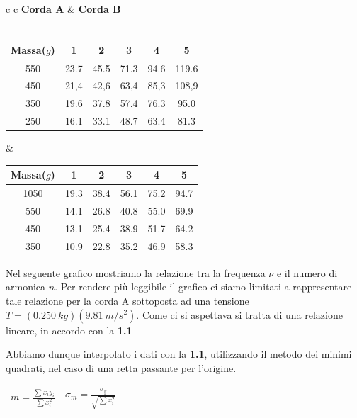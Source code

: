 \begin{center}
\begin{tabular}{c     c}
\textbf{Corda A} & \textbf{Corda B}\\
\\
\begin{tabular}{ c | c | c | c | c | c }
Massa($g$) & 1 & 2 & 3 & 4 & 5\\
\midrule
550 & 23.7 & 45.5 & 71.3 & 94.6 & 119.6\\
450 & 21,4 & 42,6 & 63,4 & 85,3 & 108,9\\
350 & 19.6 & 37.8 & 57.4 & 76.3 & 95.0\\
250 & 16.1 & 33.1 & 48.7 & 63.4 & 81.3 \\
\end{tabular}
&
\hspace{1cm}

\begin{tabular}{ c | c | c | c | c | c }
Massa($g$) & 1 & 2 & 3 & 4 & 5\\
\midrule
1050 & 19.3 & 38.4 & 56.1 & 75.2 & 94.7 \\
550 & 14.1 & 26.8 & 40.8 & 55.0 & 69.9 \\
450 & 13.1 & 25.4 & 38.9 & 51.7 & 64.2\\
350 & 10.9 & 22.8 & 35.2 & 46.9 & 58.3\\
\end{tabular}

\end{tabular}
\end{center}


Nel seguente grafico mostriamo la relazione tra la frequenza $\nu$ e il numero di armonica $n$. Per rendere più leggibile il grafico ci siamo limitati a rappresentare tale relazione per la corda A sottoposta ad una tensione $T=(0.250\ kg)(9.81\ m/s^2)$. Come ci si aspettava si tratta di una relazione lineare, in accordo con la \textbf{1.1}


Abbiamo dunque interpolato i dati con la \textbf{1.1}, utilizzando il metodo dei minimi quadrati, nel caso di una retta passante per l'origine.

\begin{center}
\begin{tabular}{c c}
$m=\frac{\displaystyle\sum{x_i y_i}}{\displaystyle\sum{x_i^2}}$ & \hspace{2cm} $\sigma_m=\frac{\displaystyle\sigma_y}{\sqrt{\displaystyle\sum{x_i^2}}}$
\end{tabular}
\end{center}

